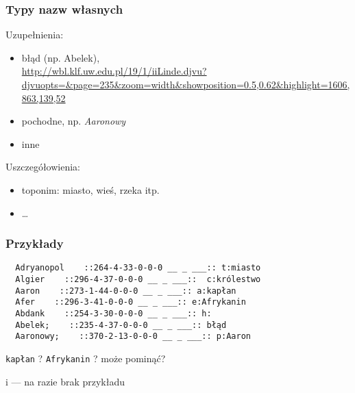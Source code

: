 \documentclass{beamer}
\begin{document}
\begin{frame}
  \frametitle{Typy nazw własnych}
  Uzupełnienia:
  \begin{itemize}
  \item \alert{błąd} (np. Abelek),\\
{\url{http://wbl.klf.uw.edu.pl/19/1/iiLinde.djvu?djvuopts=&page=235&zoom=width&showposition=0.5,0.62&highlight=1606,863,139,52}}
\item \alert{p}ochodne, np. \textit{Aaronowy}
\item \alert{i}nne
  \end{itemize}
Uszczegółowienia:
\begin{itemize}
\item toponim: miasto, wieś, rzeka itp.
\item \ldots
\end{itemize}
\end{frame}

\begin{frame}[fragile]
  \frametitle{Przykłady}
\begin{verbatim}
  Adryanopol    ::264-4-33-0-0-0 __ _ ___:: t:miasto
  Algier    ::296-4-37-0-0-0 __ _ ___::  c:królestwo
  Aaron    ::273-1-44-0-0-0 __ _ ___:: a:kapłan
  Afer    ::296-3-41-0-0-0 __ _ ___:: e:Afrykanin
  Abdank    ::254-3-30-0-0-0 __ _ ___:: h:
  Abelek;    ::235-4-37-0-0-0 __ _ ___:: błąd 
  Aaronowy;    ::370-2-13-0-0-0 __ _ ___:: p:Aaron
\end{verbatim}
\texttt{kapłan} ? \texttt{Afrykanin} ? może pominąć?

\alert{i} --- na razie brak przykładu
\end{frame}
\end{document}
